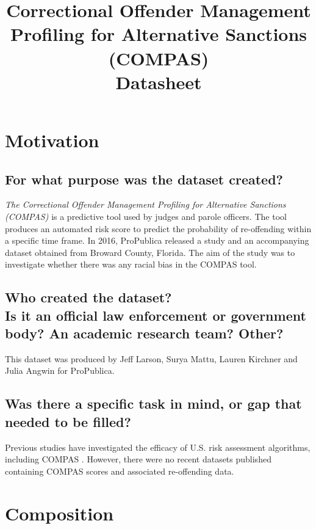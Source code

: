 \documentclass[letterpaper, 10 pt, conference]{ieeeconf}  %
\title{\LARGE \bf Correctional Offender Management Profiling for Alternative Sanctions (COMPAS) \\{\color{blue}Datasheet}}
\newcommand{\subtitle}[1]{{\\ \small \normalfont \color{purple} #1}}
\begin{document}
\maketitle
\thispagestyle{empty}
\pagestyle{empty}

\section{Motivation}

\subsection{For what purpose was the dataset created?}

\textit{The Correctional Offender Management Profiling for Alternative Sanctions (COMPAS)} is a predictive tool used by judges and parole officers. The tool produces an automated risk score to predict the probability of re-offending within a specific time frame. In 2016, ProPublica released a study \cite{angwin2016machine} and an accompanying dataset obtained from Broward County, Florida. The aim of the study was to investigate whether there was any racial bias in the COMPAS tool.

\subsection{Who created the dataset? \subtitle{Is it an official law enforcement or government body? An academic research team? Other?}}


This dataset was produced by Jeff Larson, Surya Mattu, Lauren Kirchner and Julia Angwin for ProPublica.

\subsection{Was there a specific task in mind, or gap that needed to be filled?}

Previous studies have investigated the efficacy of U.S. risk assessment algorithms, including COMPAS \cite{brennan2009evaluating}. However, there were no recent datasets published containing COMPAS scores and associated re-offending data.

\section{Composition}
\end{document}
